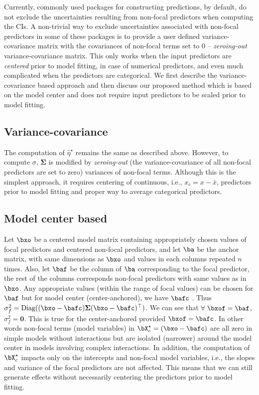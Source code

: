 Currently, commonly used  packages for constructing predictions, by default, do not exclude the uncertainties resulting from non-focal predictors when computing the CIs. A non-trivial way to exclude uncertainties associated with non-focal predictors in some of these packages is to provide a user defined variance-covariance matrix with the covariances of non-focal terms set to $0$ -- \emph{zeroing-out} variance-covariance matrix. This only works when the input predictors are \emph{centered} prior to model fitting, in case of numerical predictors, and even much complicated when the predictors are categorical. We first describe the variance-covariance based approach and then discuss our proposed method which is based on the model center and does not require input predictors to be scaled prior to model fitting.


\subsection*{Variance-covariance}

The computation of $\hat{\eta}^\star$ remains the same as described above. However, to compute $\sigma$, $\boldsymbol{\Sigma}$ is modified by \emph{zeroing-out} (the variance-covariance of all non-focal predictors are set to zero) variances of non-focal terms. Although this is the simplest approach, it requires centering of continuous, i.e., $x_c = x - \bar{x}$, predictors prior to model fitting and proper way to average categorical predictors.

\subsection*{Model center based}

Let $\bxo$ be a centered model matrix containing appropriately chosen values of focal predictors and centered non-focal predictors, and let $\ba$ be the anchor matrix, with same dimensions as $\bxo$ and values in each columns repeated $n$ times. Also, let $\baf$ be the column of $\ba$ corresponding to the focal predictor, the rest of the columns corresponds non-focal predictors with same values as in $\bxo$. Any appropriate values (within the range of focal values) can be chosen for $\baf$ but for model center (center-anchored), we have $\bafc$ . Thus $\sigma_f^2 = \textrm{Diag}((\bxo - \bafc) \boldsymbol{\Sigma} (\bxo - \bafc)^\top)$. We can see that $\forall ~\bxof=\baf$, $\sigma_f^2 = \boldsymbol{0}$. This is true for the center-anchored provided $\bxof=\bafc$. In other words non-focal terms (model variables) in $\bX^{\star}_{c} = (\bxo - \bafc)$ are all zero in simple models without interactions but are isolated (narrower) around the model center in models involving complex interactions. In addition, the computation of $\bX^{\star}_c$ impacts only on the intercepts and non-focal model variables, i.e., the slopes and variance of the focal predictors are not affected. This means that we can still generate effects without necessarily centering the predictors prior to model fitting.

